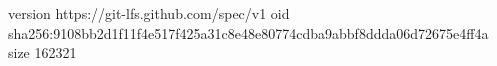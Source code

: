 version https://git-lfs.github.com/spec/v1
oid sha256:9108bb2d1f11f4e517f425a31c8e48e80774cdba9abbf8ddda06d72675e4ff4a
size 162321
